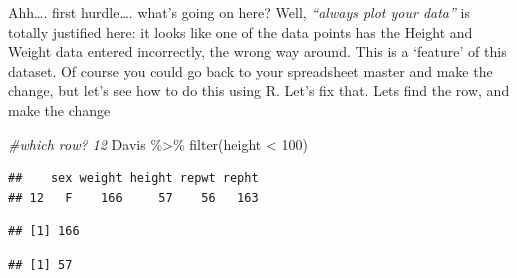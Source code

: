 \documentclass[
]{book}
\newenvironment{Shaded}{\begin{snugshade}}{\end{snugshade}}
\newcommand{\AttributeTok}[1]{\textcolor[rgb]{0.77,0.63,0.00}{#1}}
\newcommand{\CommentTok}[1]{\textcolor[rgb]{0.56,0.35,0.01}{\textit{#1}}}
\newcommand{\DecValTok}[1]{\textcolor[rgb]{0.00,0.00,0.81}{#1}}
\newcommand{\FunctionTok}[1]{\textcolor[rgb]{0.00,0.00,0.00}{#1}}
\newcommand{\NormalTok}[1]{#1}
\newcommand{\OtherTok}[1]{\textcolor[rgb]{0.56,0.35,0.01}{#1}}
\newcommand{\SpecialCharTok}[1]{\textcolor[rgb]{0.00,0.00,0.00}{#1}}
\begin{document}
Ahh\ldots. first hurdle\ldots. what's going on here? Well, \emph{``always plot your data''} is totally justified here: it looks like one of the data points has the Height and Weight data entered incorrectly, the wrong way around. This is a `feature' of this dataset. Of course you could go back to your spreadsheet master and make the change, but let's see how to do this using R. Let's fix that. Lets find the row, and make the change

\begin{Shaded}
\begin{Highlighting}[]
\CommentTok{\#which row? 12}
\NormalTok{Davis }\SpecialCharTok{\%\textgreater{}\%} \FunctionTok{filter}\NormalTok{(height }\SpecialCharTok{\textless{}} \DecValTok{100}\NormalTok{)}
\end{Highlighting}
\end{Shaded}

\begin{verbatim}
##    sex weight height repwt repht
## 12   F    166     57    56   163
\end{verbatim}

\begin{Shaded}
\end{Shaded}

\begin{verbatim}
## [1] 166
\end{verbatim}

\begin{Shaded}
\end{Shaded}

\begin{verbatim}
## [1] 57
\end{verbatim}

\begin{Shaded}
\end{Shaded}
\end{document}
